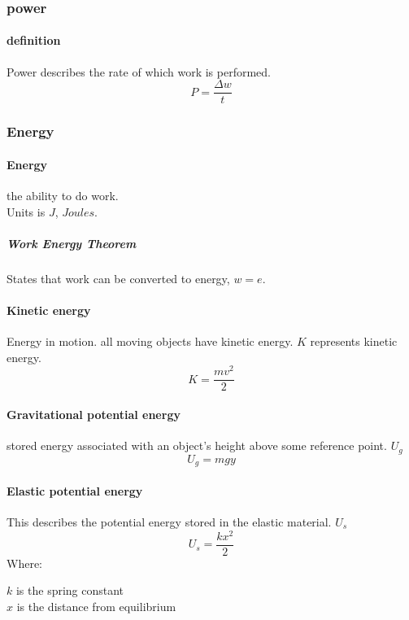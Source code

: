 \documentclass{article} %
\theoremstyle{theorem}
\theoremstyle{definition}
\begin{document}
        \subsubsection{power}
            \paragraph{definition}
                Power describes the rate of which work is performed.
                \begin{equation} P=\dfrac{\Delta w}{t} \end{equation}
        \subsubsection{Energy}
            \paragraph{Energy}
                the ability to do work.\\ Units is $J$, $Joules$.
                \subparagraph{Work Energy Theorem}
                    States that work can be converted to energy, $w=e$.
            \paragraph{Kinetic energy}
                Energy in motion. all moving objects have kinetic energy. $K$ represents kinetic energy.
                $$K=\frac{mv^2}{2}$$ 
            \paragraph{Gravitational potential energy}%
            \label{par:Gravitational potential energy}
                stored energy associated with an object's height above some reference point. $U_g$
                \begin{equation}
                    U_g=mgy
                \end{equation}
            \paragraph{Elastic potential energy}
                This describes the potential energy stored in the elastic material. $U_s$
                \begin{equation}
                    U_s=\frac{kx^2}{2}
                \end{equation}
                Where:\begin{center} $k$ is the spring constant\\$x$ is the distance from equilibrium \end{center}
\end{document}
